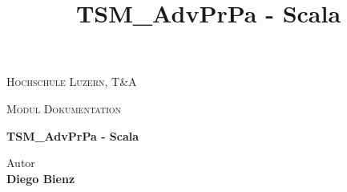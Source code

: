 
\begin{center}
\vspace{1.5cm}
{\scshape\LARGE Hochschule Luzern, T\&A \par}
{\scshape\Large Modul Dokumentation\par}
\vspace{2.0cm}
\title{TSM\_AdvPrPa - Scala}
{\huge\bfseries TSM\_AdvPrPa - Scala\par}

\vspace{16.0cm}

\end{center}

Autor \\
\textbf{Diego Bienz} \\


